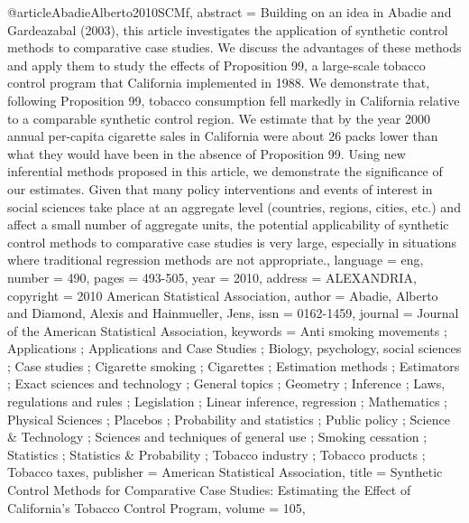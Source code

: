 @article{AbadieAlberto2010SCMf,
abstract = {Building on an idea in Abadie and Gardeazabal (2003), this article investigates the application of synthetic control methods to comparative case studies. We discuss the advantages of these methods and apply them to study the effects of Proposition 99, a large-scale tobacco control program that California implemented in 1988. We demonstrate that, following Proposition 99, tobacco consumption fell markedly in California relative to a comparable synthetic control region. We estimate that by the year 2000 annual per-capita cigarette sales in California were about 26 packs lower than what they would have been in the absence of Proposition 99. Using new inferential methods proposed in this article, we demonstrate the significance of our estimates. Given that many policy interventions and events of interest in social sciences take place at an aggregate level (countries, regions, cities, etc.) and affect a small number of aggregate units, the potential applicability of synthetic control methods to comparative case studies is very large, especially in situations where traditional regression methods are not appropriate.},
language = {eng},
number = {490},
pages = {493-505},
year = {2010},
address = {ALEXANDRIA},
copyright = {2010 American Statistical Association},
author = {Abadie, Alberto and Diamond, Alexis and Hainmueller, Jens},
issn = {0162-1459},
journal = {Journal of the American Statistical Association},
keywords = {Anti smoking movements ; Applications ; Applications and Case Studies ; Biology, psychology, social sciences ; Case studies ; Cigarette smoking ; Cigarettes ; Estimation methods ; Estimators ; Exact sciences and technology ; General topics ; Geometry ; Inference ; Laws, regulations and rules ; Legislation ; Linear inference, regression ; Mathematics ; Physical Sciences ; Placebos ; Probability and statistics ; Public policy ; Science & Technology ; Sciences and techniques of general use ; Smoking cessation ; Statistics ; Statistics & Probability ; Tobacco industry ; Tobacco products ; Tobacco taxes},
publisher = {American Statistical Association},
title = {Synthetic Control Methods for Comparative Case Studies: Estimating the Effect of California's Tobacco Control Program},
volume = {105},
}
